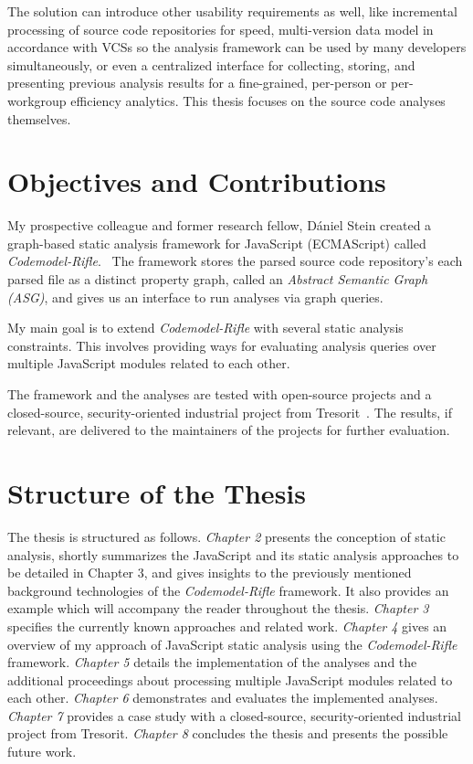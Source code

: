 The solution can introduce other usability requirements as well, like incremental processing of source code repositories for speed, multi-version data model in accordance with VCSs so the analysis framework can be used by many developers simultaneously, or even a centralized interface for collecting, storing, and presenting previous analysis results for a fine-grained, per-person or per-workgroup efficiency analytics. This thesis focuses on the source code analyses themselves.


\section{Objectives and Contributions}

My prospective colleague and former research fellow, Dániel Stein created a graph-based static analysis framework for JavaScript (ECMAScript) called \emph{Codemodel-Rifle}.~\cite{stein-daniel-msc} The framework stores the parsed source code repository's each parsed file as a distinct property graph, called an \emph{Abstract Semantic Graph (ASG)}, and gives us an interface to run analyses via graph queries.

My main goal is to extend \emph{Codemodel-Rifle} with several static analysis constraints. This involves providing ways for evaluating analysis queries over multiple JavaScript modules related to each other.

The framework and the analyses are tested with open-source projects and a closed-source, security-oriented industrial project from Tresorit~\cite{tresorit}. The results, if relevant, are delivered to the maintainers of the projects for further evaluation.


\section{Structure of the Thesis}

The thesis is structured as follows. \emph{Chapter 2} presents the conception of static analysis, shortly summarizes the JavaScript and its static analysis approaches to be detailed in Chapter 3, and gives insights to the previously mentioned background technologies of the \emph{Codemodel-Rifle} framework. It also provides an example which will accompany the reader throughout the thesis. \emph{Chapter 3} specifies the currently known approaches and related work. \emph{Chapter 4} gives an overview of my approach of JavaScript static analysis using the \emph{Codemodel-Rifle} framework. \emph{Chapter 5} details the implementation of the analyses and the additional proceedings about processing multiple JavaScript modules related to each other. \emph{Chapter 6} demonstrates and evaluates the implemented analyses. \emph{Chapter 7} provides a case study with a closed-source, security-oriented industrial project from Tresorit. \emph{Chapter 8} concludes the thesis and presents the possible future work.


